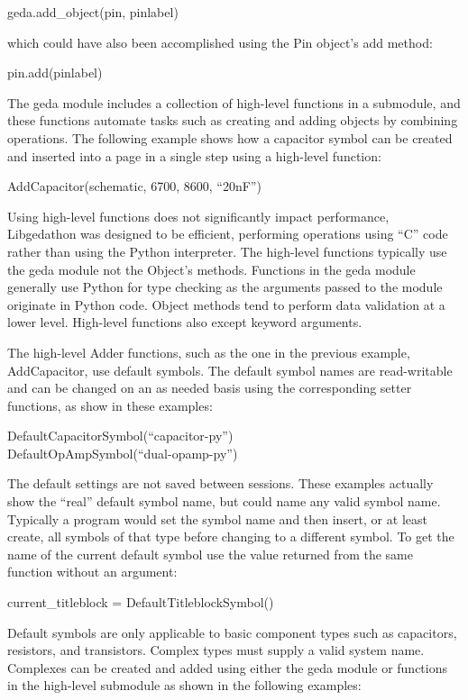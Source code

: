 geda.add\_object(pin, pinlabel)

  which could have also been accomplished using the Pin object's add method:

pin.add(pinlabel)


  The geda module includes a collection of high-level functions in a submodule, and these functions automate tasks such as creating and adding objects by combining operations. The following example shows how a capacitor symbol can be created and inserted into a page in a single step using a high-level function:

AddCapacitor(schematic, 6700, 8600, ``20nF'')


  Using high-level functions does not significantly impact performance, Libgedathon was designed to be efficient, performing operations using ``C'' code rather than using the Python interpreter. The high-level functions typically use the geda module not the Object's methods. Functions in the geda module generally use Python for type checking as the arguments passed to the module originate in Python code. Object methods tend to perform data validation at a lower level. High-level functions also except keyword arguments.


  The high-level Adder functions, such as the one in the previous example, AddCapacitor, use default symbols. The default symbol names are read-writable and can be changed on an as needed basis using the corresponding setter functions, as show in these examples:

DefaultCapacitorSymbol(``capacitor-py'')
\\ 
DefaultOpAmpSymbol(``dual-opamp-py'')


  The default settings are not saved between sessions. These examples actually show the ``real'' default symbol name, but could name any valid symbol name. Typically a program would set the symbol name and then insert, or at least create, all symbols of that type before changing to a different symbol. To get the name of the current default symbol use the value returned from the same function without an argument:

current\_titleblock = DefaultTitleblockSymbol()


  Default symbols are only applicable to basic component types such as capacitors, resistors, and transistors. Complex types must supply a valid system name. Complexes can be created and added using either the geda module or functions in the high-level submodule as shown in the following examples:

